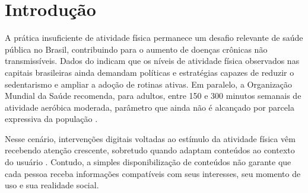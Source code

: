 \documentclass[a4paper,12pt]{article}
\newcommand{\keyword}[1]{\textsf{#1}}
\begin{document}
\newpage 
{}
\begin{abstract}
\noindent
This work presents the development and evaluation of a recommender system aimed at personalizing fitness-related content in a social network. The proposal uses the LDBC SNB dataset as its experimental basis, from which posts, interactions, declared interests, and social relationships associated with physical activity are extracted. On top of these data, a reproducible pipeline was structured for data preparation, train-validation-test splitting, training, and evaluation. The recommender combines content similarity, tag co-occurrence, recency, popularity, and social graph influence in an explainable hybrid baseline, while also including a Learning to Rank track with LightGBMRanker for model comparison. Results showed that the hybrid baseline achieved the best NDCG@10 (0.0023 on \texttt{SF3}), while the LightGBMRanker led in NDCG@100 (0.0082) and in the qualitative manual evaluation (9/12 criteria met).
\\\textbf{\keyword{Keywords: }}Recommendation Systems, Learning to Rank, Social Graph, Physical Activity
\end{abstract}

\newpage

 \onehalfspace  %
 \setlength{\parindent}{1.25cm}


\section{Introdução}
A prática insuficiente de atividade física permanece um desafio relevante de saúde pública no Brasil, contribuindo para o aumento de doenças crônicas não transmissíveis. Dados do  indicam que os níveis de atividade física observados nas capitais brasileiras ainda demandam políticas e estratégias capazes de reduzir o sedentarismo e ampliar a adoção de rotinas ativas. Em paralelo, a Organização Mundial da Saúde recomenda, para adultos, entre 150 e 300 minutos semanais de atividade aeróbica moderada, parâmetro que ainda não é alcançado por parcela expressiva da população \cite{WHO2020}.

Nesse cenário, intervenções digitais voltadas ao estímulo da atividade física vêm recebendo atenção crescente, sobretudo quando adaptam conteúdos ao contexto do usuário \cite{Agans2025PARecommender,Venka2022CARS}. Contudo, a simples disponibilização de conteúdos não garante que cada pessoa receba informações compatíveis com seus interesses, seu momento de uso e sua realidade social.
\end{document}
